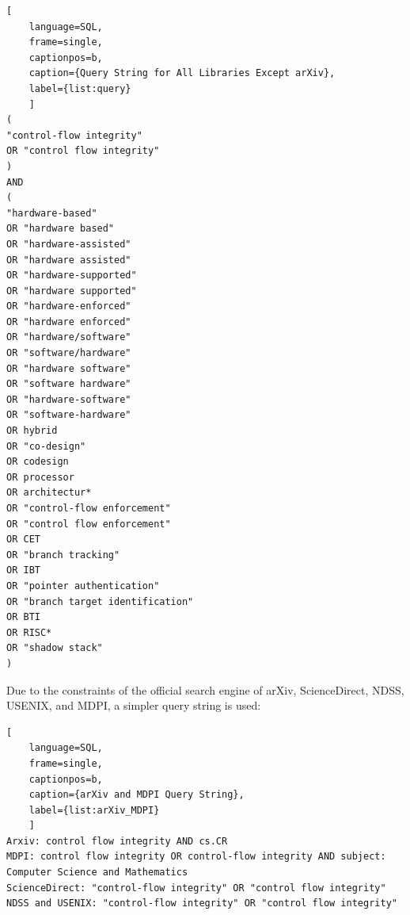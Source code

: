 \documentclass[journal,onecolumn]{IEEEtran}
\begin{document}
\appendix

\begin{lstlisting}[
	language=SQL, 
	frame=single, 
	captionpos=b,
	caption={Query String for All Libraries Except arXiv}, 
	label={list:query}
	]
(
"control-flow integrity"
OR "control flow integrity"
)
AND
(
"hardware-based"
OR "hardware based"
OR "hardware-assisted"
OR "hardware assisted"
OR "hardware-supported"
OR "hardware supported"
OR "hardware-enforced"
OR "hardware enforced"
OR "hardware/software"
OR "software/hardware"
OR "hardware software"
OR "software hardware"
OR "hardware-software"
OR "software-hardware"
OR hybrid
OR "co-design"
OR codesign
OR processor
OR architectur*
OR "control-flow enforcement"
OR "control flow enforcement"
OR CET
OR "branch tracking"
OR IBT
OR "pointer authentication"
OR "branch target identification"
OR BTI
OR RISC*
OR "shadow stack"
)
\end{lstlisting}

Due to the constraints of the official search engine of arXiv, ScienceDirect, NDSS, USENIX, and MDPI, a simpler query string is used:

\begin{lstlisting}[
	language=SQL, 
	frame=single, 
	captionpos=b,
	caption={arXiv and MDPI Query String}, 
	label={list:arXiv_MDPI}
	]
Arxiv: control flow integrity AND cs.CR
MDPI: control flow integrity OR control-flow integrity AND subject: Computer Science and Mathematics
ScienceDirect: "control-flow integrity" OR "control flow integrity"
NDSS and USENIX: "control-flow integrity" OR "control flow integrity"
\end{lstlisting}
\end{document}
